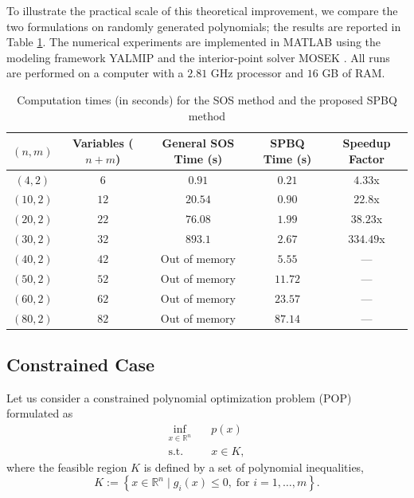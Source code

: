 \documentclass[12pt]{elsarticle}
\theoremstyle{definition}
\begin{document}
To illustrate the practical scale of this theoretical improvement, we compare the two formulations on randomly generated polynomials; the results are reported in Table \ref{tab:computation_times}. The numerical experiments are implemented in MATLAB using the modeling framework YALMIP \cite{lofberg2008modeling} and the interior-point solver MOSEK \cite{mosek_toolbox_9_1}. All runs are performed on a computer with a $2.81$ GHz processor and $16$ GB of RAM.

\begin{table}[htpb]
    \centering
    \renewcommand{\arraystretch}{1.3}
    \begin{tabular}{||c|c|c|c|c||}
        \hline
        $(n, m)$ & Variables ($n+m$) & General SOS Time (s) & SPBQ Time (s) & Speedup Factor \\
        \hline\hline
        $(4, 2)$  & $6$  & $0.91$ & $0.21$ & $4.33$x \\
        \hline
        $(10, 2)$ & $12$ & $20.54$ & $0.90$ & $22.8$x \\
        \hline
        $(20, 2)$ & $22$ & $76.08$ & $1.99$ & $38.23$x \\
        \hline
        $(30, 2)$ & $32$ & $893.1$      & $2.67$ & $334.49$x \\
        \hline
        $(40, 2)$ & $42$ & Out of memory     & $5.55$ & --- \\
        \hline
        $(50, 2)$ & $52$ & Out of memory     & $11.72$ & --- \\
        \hline
        $(60, 2)$ & $62$ & Out of memory     & $23.57$ & --- \\
        \hline
        $(80, 2)$ & $82$ & Out of memory     & $87.14$ & --- \\
        \hline
    \end{tabular}
    \caption{Computation times (in seconds) for the SOS method and the proposed SPBQ method}
    \label{tab:computation_times}
\end{table}

\subsection{Constrained Case}\label{cons opt}

Let us consider a constrained polynomial optimization problem (POP) formulated as
\begin{equation}\label{cons}
\begin{aligned}
\inf_{x \in \mathbb{R}^n} \quad & p(x) \\
\text{s.t.} \quad & x \in K,
\end{aligned}
\end{equation}
where the feasible region $K$ is defined by a set of polynomial inequalities,
\[
K := \left\{ x \in \mathbb{R}^n \mid g_i(x) \le 0, \; \text{for } i = 1, \dots, m \right\}.
\]
\end{document}
